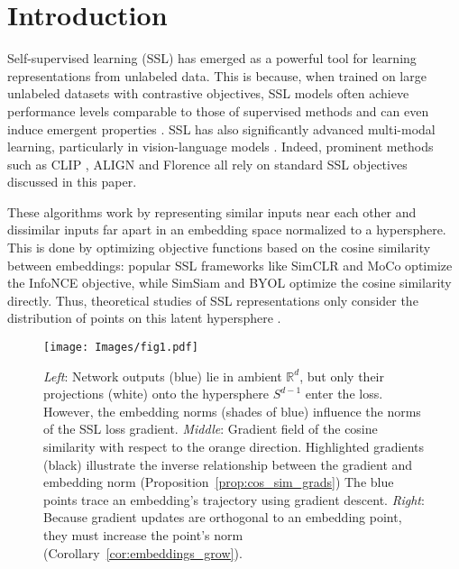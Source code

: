 \section{Introduction}

Self-supervised learning (SSL) has emerged as a powerful tool for learning representations from unlabeled data. 
This is because, when trained on large unlabeled datasets with contrastive objectives, SSL models often achieve performance levels comparable to those of supervised methods and can even induce emergent properties \citep{simclr, dino}. SSL has also significantly advanced multi-modal learning, particularly in vision-language models \citep{imagebind, foundation_models}.
Indeed, prominent methods such as CLIP \citep{clip}, ALIGN \citep{align} and Florence \citep{florence} all rely on standard SSL objectives discussed in this paper.

These algorithms work by representing similar inputs near each other and dissimilar inputs far apart in an embedding space normalized to a hypersphere. This is done by optimizing objective functions based on the cosine similarity between embeddings: popular SSL frameworks like SimCLR \citep{simclr} and MoCo \citep{moco} optimize the InfoNCE objective, while SimSiam \citep{simsiam} and BYOL \citep{byol} optimize the cosine similarity directly. 
Thus, theoretical studies of SSL representations only consider the distribution of points on this latent hypersphere \citep{understanding_contr_learn, latent_inversion}. 

\begin{figure*}
    \centering
    \texttt{[image: Images/fig1.pdf]}
    \vspace*{-1.5em}
    \caption{\emph{Left}: Network outputs (blue) lie in ambient $\mathbb{R}^d$, but only their projections (white) onto the hypersphere $S^{d-1}$ enter the loss. However, the embedding norms (shades of blue) influence the norms of the SSL loss gradient. \emph{Middle}: Gradient field of the cosine similarity with respect to the orange direction. Highlighted gradients (black) illustrate the inverse relationship between the gradient and embedding norm (Proposition~\ref{prop:cos_sim_grads}) The blue points trace an embedding's trajectory using gradient descent. \emph{Right}: Because gradient updates are orthogonal to an embedding point, they must increase the point's norm (Corollary~\ref{cor:embeddings_grow}).}
    \label{fig:fig1}
\end{figure*}


